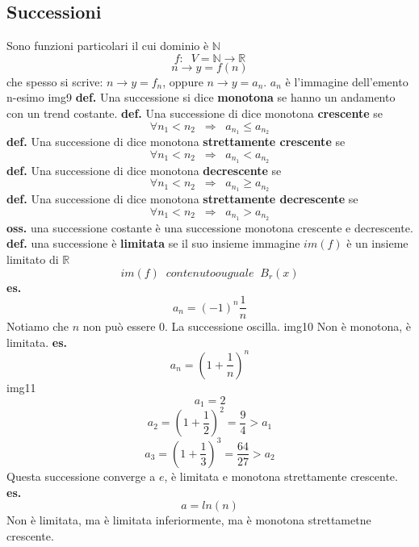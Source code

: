 \subsection*{Successioni}
Sono funzioni particolari il cui dominio è $\mathbb{N}$
\[
    f:\;\; V = \mathbb{N} \rightarrow \mathbb{R}
\]
\[
    n \rightarrow y= f(n)
\]
che spesso si scrive: $n \rightarrow y= f_n$, oppure $n \rightarrow y= a_n$.
\newline
$a_n$ è l'immagine dell'emento n-esimo
\newline
img9
\newline
\newline
\textbf{def.} Una successione si dice \textbf{monotona} se hanno un andamento con un trend costante.
\newline
\textbf{def.} Una successione di dice monotona \textbf{crescente} se
\[
    \forall n_1 < n_2 \;\; \Rightarrow \;\; a_{n_{1}} \leq a_{n_{2}}
\]
\newline
\textbf{def.} Una successione di dice monotona \textbf{strettamente crescente} se
\[
    \forall n_1 < n_2 \;\; \Rightarrow \;\; a_{n_{1}} < a_{n_{2}}
\]
\newline
\textbf{def.} Una successione di dice monotona \textbf{decrescente} se
\[
    \forall n_1 < n_2 \;\; \Rightarrow \;\; a_{n_{1}} \geq a_{n_{2}}
\]
\newline
\textbf{def.} Una successione di dice monotona \textbf{strettamente decrescente} se
\[
    \forall n_1 < n_2 \;\; \Rightarrow \;\; a_{n_{1}} > a_{n_{2}}
\]
\textbf{oss.} una successione costante è una successione monotona crescente e decrescente.
\newline
\textbf{def.} una successione è \textbf{limitata} se il suo insieme immagine $im(f)$ è un insieme limitato di $\mathbb{R}$
\[
    im(f) \;\;contenutoouguale\;\; B_r(x)
\]
\textbf{es.}
\[
    a_n = (-1)^n \frac{1}{n}
\]
Notiamo che $n$ non può essere $0$. La successione oscilla.
\newline
img10
\newline
Non è monotona, è limitata.
\newline
\textbf{es.} 
\[
    a_n= \left(1+\frac{1}{n}\right)^n
\]
img11
\newline
\[
    a_1 = 2
\]
\[
    a_2 = (1 + \frac{1}{2})^2 = \frac{9}{4} > a_1
\]
\[
    a_3 = (1 + \frac{1}{3})^3 = \frac{64}{27} > a_2
\]
Questa successione converge a $e$, è limitata e monotona strettamente crescente.
\newline
\textbf{es.}
\[
    a = ln(n)
\]
Non è limitata, ma è limitata inferiormente, ma è monotona strettametne crescente.
